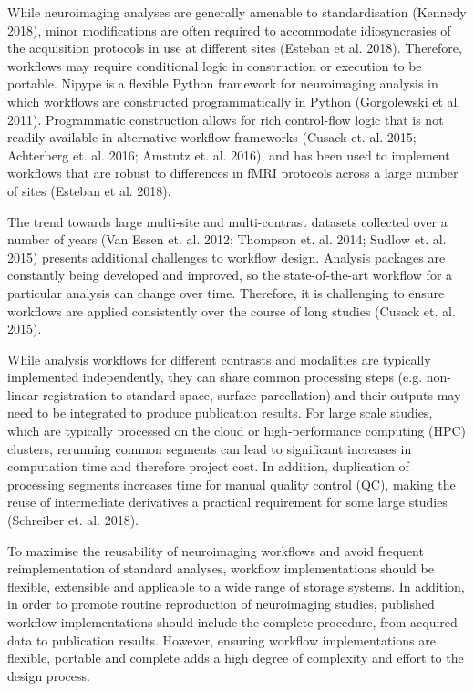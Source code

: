 While neuroimaging analyses are generally amenable to standardisation
(Kennedy 2018), minor modifications are often required to accommodate
idiosyncrasies of the acquisition protocols in use at different sites
(Esteban et al. 2018). Therefore, workflows may require conditional
logic in construction or execution to be portable. Nipype is a flexible
Python framework for neuroimaging analysis in which workflows are
constructed programmatically in Python (Gorgolewski et al. 2011).
Programmatic construction allows for rich control-flow logic that is not
readily available in alternative workflow frameworks (Cusack et. al.
2015; Achterberg et. al. 2016; Amstutz et. al. 2016), and has been used
to implement workflows that are robust to differences in fMRI protocols
across a large number of sites (Esteban et al. 2018).

The trend towards large multi-site and multi-contrast datasets collected
over a number of years (Van Essen et. al. 2012; Thompson et. al. 2014;
Sudlow et. al. 2015) presents additional challenges to workflow design.
Analysis packages are constantly being developed and improved, so the
state-of-the-art workflow for a particular analysis can change over
time. Therefore, it is challenging to ensure workflows are applied
consistently over the course of long studies (Cusack et. al. 2015).

While analysis workflows for different contrasts and modalities are
typically implemented independently, they can share common processing
steps (e.g. non-linear registration to standard space, surface
parcellation) and their outputs may need to be integrated to produce
publication results. For large scale studies, which are typically
processed on the cloud or high-performance computing (HPC) clusters,
rerunning common segments can lead to significant increases in
computation time and therefore project cost. In addition, duplication of
processing segments increases time for manual quality control (QC),
making the reuse of intermediate derivatives a practical requirement for
some large studies (Schreiber et. al. 2018).

To maximise the reusability of neuroimaging workflows and avoid frequent
reimplementation of standard analyses, workflow implementations should
be flexible, extensible and applicable to a wide range of storage
systems. In addition, in order to promote routine reproduction of
neuroimaging studies, published workflow implementations should include
the complete procedure, from acquired data to publication results.
However, ensuring workflow implementations are flexible, portable and
complete adds a high degree of complexity and effort to the design
process.

